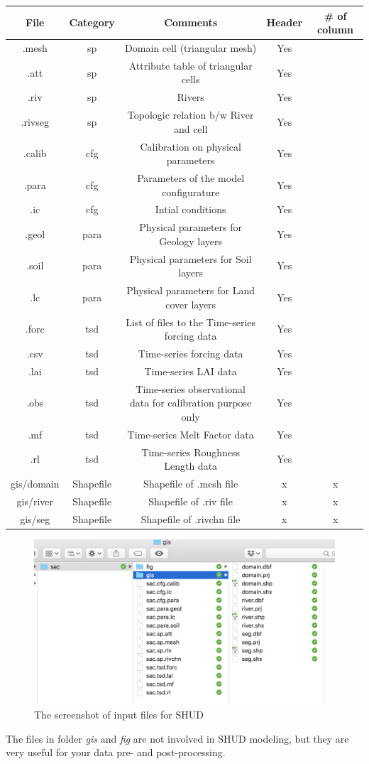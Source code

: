 \documentclass[
]{scrbook}
\begin{document}
\begin{longtable}[]{@{}ccccc@{}}
\toprule
File & Category & Comments & Header & \# of column\tabularnewline
\midrule
\endhead
.mesh & sp & Domain cell (triangular mesh) & Yes &\tabularnewline
.att & sp & Attribute table of triangular cells & Yes &\tabularnewline
.riv & sp & Rivers & Yes &\tabularnewline
.rivseg & sp & Topologic relation b/w River and cell & Yes &\tabularnewline
.calib & cfg & Calibration on physical parameters & Yes &\tabularnewline
.para & cfg & Parameters of the model configurature & Yes &\tabularnewline
.ic & cfg & Intial conditions & Yes &\tabularnewline
.geol & para & Physical parameters for Geology layers & Yes &\tabularnewline
.soil & para & Physical parameters for Soil layers & Yes &\tabularnewline
.lc & para & Physical parameters for Land cover layers & Yes &\tabularnewline
.forc & tsd & List of files to the Time-series forcing data & Yes &\tabularnewline
.csv & tsd & Time-series forcing data & Yes &\tabularnewline
.lai & tsd & Time-series LAI data & Yes &\tabularnewline
.obs & tsd & Time-series observational data for calibration purpose only & Yes &\tabularnewline
.mf & tsd & Time-series Melt Factor data & Yes &\tabularnewline
.rl & tsd & Time-series Roughness Length data & Yes &\tabularnewline
gis/domain & Shapefile & Shapefile of .mesh file & x & x\tabularnewline
gis/river & Shapefile & Shapefile of .riv file & x & x\tabularnewline
gis/seg & Shapefile & Shapefile of .rivchn file & x & x\tabularnewline
\bottomrule
\end{longtable}

\begin{figure}
\centering
\includegraphics{Fig/IO/Inputfiles.png}
\caption{The screenshot of input files for SHUD}
\end{figure}

The files in folder \emph{gis} and \emph{fig} are not involved in SHUD modeling, but they are very useful for your data pre- and post-processing.
\end{document}
